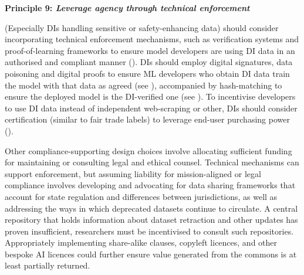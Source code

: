 \textbf{Principle 9: \textit{Leverage agency through technical enforcement}}

(Especially DIs handling sensitive or safety-enhancing data) should consider incorporating technical enforcement mechanisms, such as verification systems and proof-of-learning frameworks to ensure model developers are using DI data in an authorised and compliant manner (\cite{jia2021}). DIs should employ digital signatures, data poisoning and digital proofs to ensure ML developers who obtain DI data train the model with that data as agreed (see \cite{cina2023WildPatternsReloaded, tian2022ComprehensiveSurveyPoisoning}), accompanied by hash-matching to ensure the deployed model is the DI-verified one (see \textcite{chan2023ReclaimingDigitalCommons}). To incentivise developers to use DI data instead of independent web-scraping or other, DIs should consider certification (similar to fair trade labels) to leverage end-user purchasing power (\cite{chan2023ReclaimingDigitalCommons}).

Other compliance-supporting design choices involve allocating sufficient funding for maintaining or consulting legal and ethical counsel. Technical mechanisms can support enforcement, but assuming liability for mission-aligned or legal compliance involves developing and advocating for data sharing frameworks that account for state regulation and differences between jurisdictions, as well as addressing the ways in which deprecated datasets continue to circulate. A central repository that holds information about dataset retraction and other updates has proven insufficient, researchers must be incentivised to consult such repositories. Appropriately implementing share-alike clauses, copyleft licences, and other bespoke AI licences could further ensure value generated from the commons is at least partially returned.
